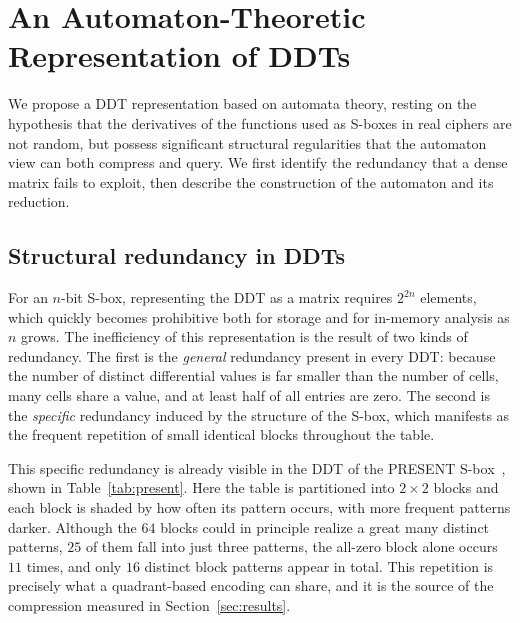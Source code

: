 \documentclass[runningheads]{llncs}
\begin{document}
\section{An Automaton-Theoretic Representation of DDTs}
\label{sec:auto}

We propose a DDT representation based on automata theory, resting on the
hypothesis that the derivatives of the functions used as S-boxes in real ciphers
are not random, but possess significant structural regularities that the
automaton view can both compress and query. We first identify the redundancy
that a dense matrix fails to exploit, then describe the construction of the
automaton and its reduction.

\subsection{Structural redundancy in DDTs}
\label{sec:redundancy}

For an $n$-bit S-box, representing the DDT as a matrix requires $2^{2n}$ elements,
which quickly becomes prohibitive both for storage and for in-memory analysis as
$n$ grows. The inefficiency of this representation is the result of two kinds of
redundancy. The first is the \emph{general} redundancy present in every DDT:
because the number of distinct differential values is far smaller than the number
of cells, many cells share a value, and at least half of all entries are zero. The
second is the \emph{specific} redundancy induced by the structure of the S-box,
which manifests as the frequent repetition of small identical blocks throughout
the table.

This specific redundancy is already visible in the DDT of the PRESENT
S-box~\cite{BogdanovEtAl2007}, shown
in Table~\ref{tab:present}. Here the table is partitioned into $2\times 2$ blocks
and each block is shaded by how often its pattern occurs, with more frequent
patterns darker. Although the $64$ blocks could in principle realize a great many
distinct patterns, $25$ of them fall into just three patterns, the all-zero
block alone occurs $11$ times, and only $16$ distinct block patterns appear in
total. This repetition is precisely what a quadrant-based encoding can share, and
it is the source of the compression measured in Section~\ref{sec:results}.

\begin{table}[t]
\centering
\caption{The DDT of the PRESENT S-box, partitioned into $2\times2$ blocks and
shaded by pattern frequency (darker $=$ more frequent; zero entries shown as a
dot). Twenty-five of the $64$ blocks fall into the three most common patterns.}
\label{tab:present}
\setlength{\tabcolsep}{0pt}\renewcommand{\arraystretch}{1.1}
\footnotesize

\end{table}
\end{document}
